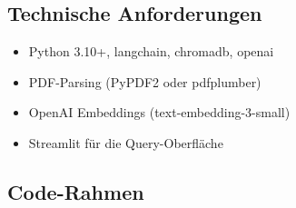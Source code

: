 \subsection*{Technische Anforderungen}
\begin{itemize}[leftmargin=*]
    \item Python 3.10+, langchain, chromadb, openai
    \item PDF-Parsing (PyPDF2 oder pdfplumber)
    \item OpenAI Embeddings (text-embedding-3-small)
    \item Streamlit für die Query-Oberfläche
\end{itemize}

\subsection*{Code-Rahmen}

